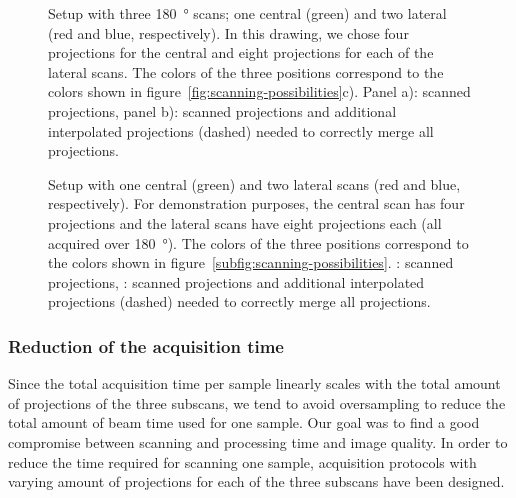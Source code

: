 \ifiucr
	\begin{figure}%
		\caption{Setup with three \SI{180}{\degree} scans; one central (green) and two lateral (red and blue, respectively). In this drawing, we chose four projections for the central and eight projections for each of the lateral scans. The colors of the three positions correspond to the colors shown in figure~\ref{fig:scanning-possibilities}c). Panel a): scanned projections, panel b): scanned projections and additional interpolated projections (dashed) needed to correctly merge all projections.}%
		\label{fig:projections}%
	\end{figure}%
\else
	\begin{figure*}[htp]
		\centering
		\subfloat[]{%
			\label{subfig:ProjectionSetup}%
			}%
		\subfloat[]{%
			\label{subfig:ProjectionSetupInterpolate}%
			}%
		\caption{Setup with one central (green) and two lateral scans (red and blue, respectively). For demonstration purposes, the central scan has four projections and the lateral scans have eight projections each (all acquired over \SI{180}{\degree}). The colors of the three positions correspond to the colors shown in figure~\ref{subfig:scanning-possibilities}. : scanned projections, : scanned projections and additional interpolated projections (dashed) needed to correctly merge all projections.}
		\label{fig:projections}
	\end{figure*}
\fi

\subsubsection{Reduction of the acquisition time}%
Since the total acquisition time per sample linearly scales with the total amount of projections of the three subscans, we tend to avoid oversampling to reduce the total amount of beam time used for one sample. Our goal was to find a good compromise between scanning and processing time and image quality. In order to reduce the time required for scanning one sample, acquisition protocols with varying amount of projections for each of the three subscans have been designed.

